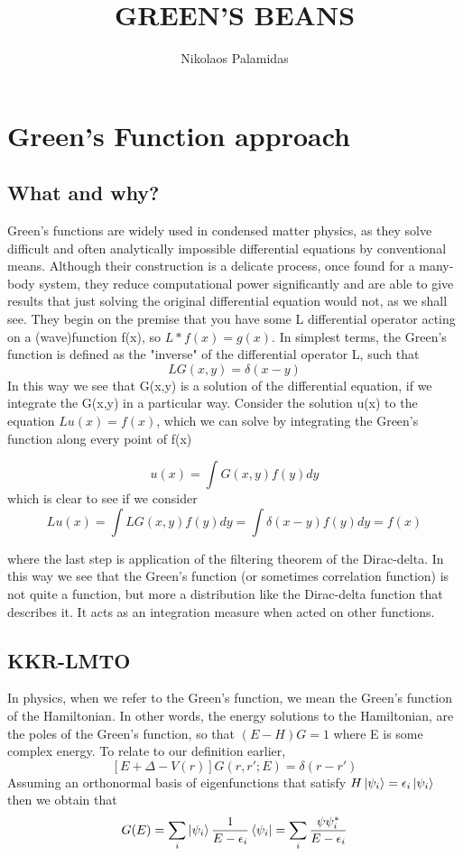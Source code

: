 \documentclass{article}
\title{GREEN'S BEANS}
\author{Nikolaos Palamidas}
\begin{document}
\maketitle


\section{Green's Function approach}
\subsection{What and why?}

Green's functions are widely used in condensed matter physics, as they solve difficult and often analytically impossible differential equations by conventional means. Although their construction is a delicate process, once found for a many-body system, they reduce computational power significantly and are able to give results that just solving the original differential equation would not, as we shall see. They begin on the premise that you have some L differential operator acting on a (wave)function f(x), so $L*f(x)=g(x)$. In simplest terms, the Green's function is defined as the "inverse" of the differential operator L, such that 
$$LG(x,y)=\delta (x-y)$$
In this way we see that G(x,y) is a solution of the differential equation, if we integrate the G(x,y) in a particular way. Consider the solution u(x) to the equation $Lu(x)=f(x)$, which we can solve by integrating the Green's function along every point of f(x)

$$u(x)=\int G(x,y)f(y)dy$$
which is clear to see if we consider 
$$Lu(x)=\int LG(x,y)f(y)dy=\int \delta(x-y)f(y)dy =f(x)$$

where the last step is application of the filtering theorem of the Dirac-delta. In this way we see that the Green's function (or sometimes correlation function) is not quite a function, but more a distribution like the Dirac-delta function that describes it. It acts as an integration measure when acted on other functions.

\subsection{KKR-LMTO}

In physics, when we refer to the Green's function, we mean the Green's function of the Hamiltonian. In other words, the energy solutions to the Hamiltonian, are the poles of the Green's function, so that $(E-H)G=1$ where E is some complex energy. To relate to our definition earlier,
$$[E+\Delta -V(r)]G(r,r';E)=\delta (r-r') $$
Assuming an orthonormal basis of eigenfunctions that satisfy $H\ket{\psi_i}=\epsilon_i \ket{\psi_i}$ then we obtain that 
$$G(E) = \sum_i \ket{\psi_i} \frac{1}{E-\epsilon_i} \bra{\psi_i}=\sum_i \frac{\psi \psi_i^*}{E-\epsilon_i}$$
\end{document}
